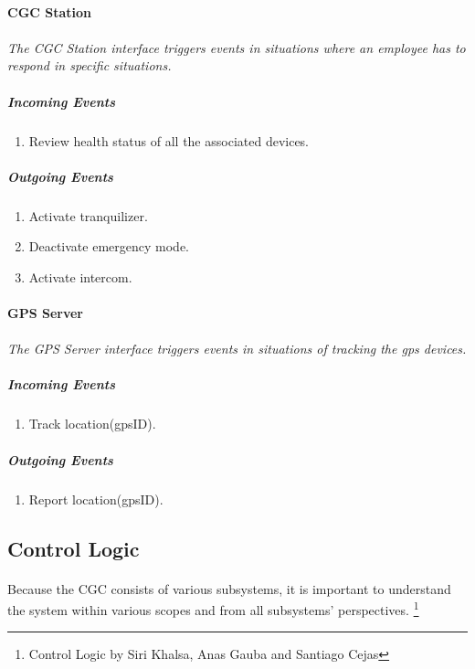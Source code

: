 \documentclass[12pt]{article}
\begin{document}
	\paragraph{CGC Station}
	\paragraph{}\textit{The CGC Station interface triggers events in situations where an employee has to respond in specific situations. }
	    \subparagraph{Incoming Events}
		\begin{enumerate}
			\item Review health status of all the associated devices.
		\end{enumerate}
				
	    \subparagraph{Outgoing Events}
		\begin{enumerate}
			\item Activate tranquilizer.
			\item Deactivate emergency mode.
			\item Activate intercom. 
		\end{enumerate}

	\paragraph{GPS Server}
	\paragraph{}\textit{The GPS Server interface triggers events in situations of tracking the gps devices. }
	    \subparagraph{Incoming Events}
		\begin{enumerate}
			\item Track location(gpsID).
		\end{enumerate}
				
	    \subparagraph{Outgoing Events}
		\begin{enumerate}
			\item Report location(gpsID).
		\end{enumerate}						
		
    \subsection{Control Logic} \label{logic}%
	\paragraph{} Because the CGC consists of various subsystems, it is important to understand 
	the system within various scopes and from all subsystems' perspectives. \footnote{Control 
	Logic by Siri Khalsa, Anas Gauba and Santiago Cejas}
\end{document}
